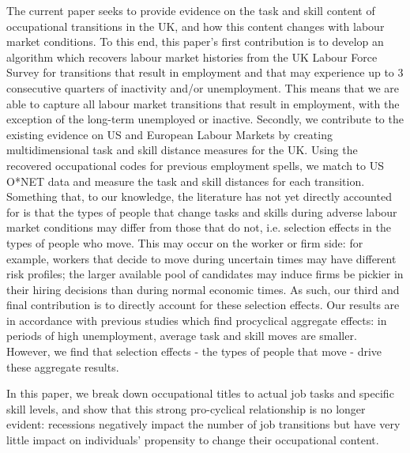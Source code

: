 \documentclass[12pt,authoryear]{elsarticle}
\begin{document}
	The current paper seeks to provide evidence on the task and skill content of occupational transitions in the UK, and how this content changes with labour market conditions. To this end, this paper's first contribution is to develop an algorithm which recovers labour market histories from the UK Labour Force Survey for transitions that result in employment and that may experience up to 3 consecutive quarters of inactivity and/or unemployment. This means that we are able to capture all labour market transitions that result in employment, with the exception of the long-term unemployed or inactive. Secondly, we contribute to the existing evidence on US and European Labour Markets by creating multidimensional task and skill distance measures for the UK.  Using the recovered occupational codes for previous employment spells, we match to US O*NET data and measure the task and skill distances for each transition. Something that, to our knowledge, the literature has not yet directly accounted for is that the types of people that change tasks and skills during adverse labour market conditions may differ from those that do not, i.e. selection effects in the types of people who move. This may occur on the worker or firm side: for example, workers that decide to move during uncertain times may have different risk profiles; the larger available pool of candidates may induce firms be pickier in their hiring decisions than during normal economic times. As such, our third and final contribution is to directly account for these selection effects. Our results are in accordance with previous studies which find procyclical aggregate effects: in periods of high unemployment, average task and skill moves are smaller. However, we find that selection effects - the types of people that move - drive these aggregate results. 


	
	
	In this paper, we break down occupational titles to actual job tasks and specific skill levels, and show that this strong pro-cyclical relationship is no longer evident: recessions negatively impact the number of job transitions but have very little impact on individuals' propensity to change their occupational content. 
	
	\vspace{2mm}
	
\end{document}
